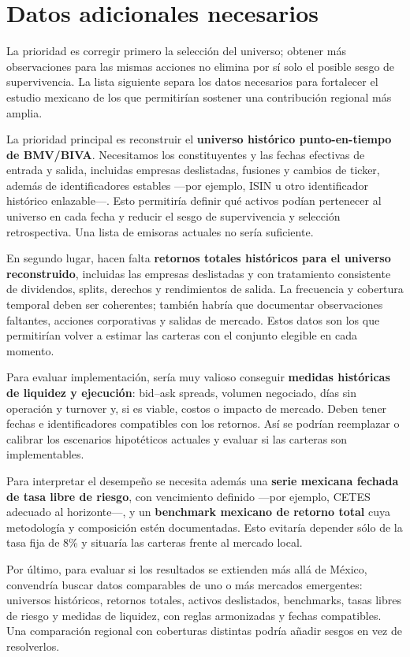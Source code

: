 \documentclass[11pt]{article}
\begin{document}
\section{Datos adicionales necesarios}

La prioridad es corregir primero la selección del universo; obtener más
observaciones para las mismas acciones no elimina por sí solo el posible
sesgo de supervivencia. La lista siguiente separa los datos necesarios para
fortalecer el estudio mexicano de los que permitirían sostener una
contribución regional más amplia.

La prioridad principal es reconstruir el \textbf{universo histórico
punto-en-tiempo de BMV/BIVA}. Necesitamos los constituyentes y las fechas
efectivas de entrada y salida, incluidas empresas deslistadas, fusiones y
cambios de ticker, además de identificadores estables —por ejemplo, ISIN u
otro identificador histórico enlazable—. Esto permitiría definir qué activos
podían pertenecer al universo en cada fecha y reducir el sesgo de
supervivencia y selección retrospectiva. Una lista de emisoras actuales no
sería suficiente.

En segundo lugar, hacen falta \textbf{retornos totales históricos para el
universo reconstruido}, incluidas las empresas deslistadas y con tratamiento
consistente de dividendos, splits, derechos y rendimientos de salida. La
frecuencia y cobertura temporal deben ser coherentes; también habría que
documentar observaciones faltantes, acciones corporativas y salidas de
mercado. Estos datos son los que permitirían volver a estimar las carteras
con el conjunto elegible en cada momento.

Para evaluar implementación, sería muy valioso conseguir \textbf{medidas
históricas de liquidez y ejecución}: bid--ask spreads, volumen negociado,
días sin operación y turnover y, si es viable, costos o impacto de mercado.
Deben tener fechas e identificadores compatibles con los retornos. Así se
podrían reemplazar o calibrar los escenarios hipotéticos actuales y evaluar
si las carteras son implementables.

Para interpretar el desempeño se necesita además una \textbf{serie mexicana
fechada de tasa libre de riesgo}, con vencimiento definido —por ejemplo,
CETES adecuado al horizonte—, y un \textbf{benchmark mexicano de retorno
total} cuya metodología y composición estén documentadas. Esto evitaría
depender sólo de la tasa fija de 8\% y situaría las carteras frente al mercado
local.

Por último, para evaluar si los resultados se extienden más allá de México,
convendría buscar datos comparables de uno o más mercados emergentes:
universos históricos, retornos totales, activos deslistados, benchmarks,
tasas libres de riesgo y medidas de liquidez, con reglas armonizadas y fechas
compatibles. Una comparación regional con coberturas distintas podría añadir
sesgos en vez de resolverlos.
\end{document}
